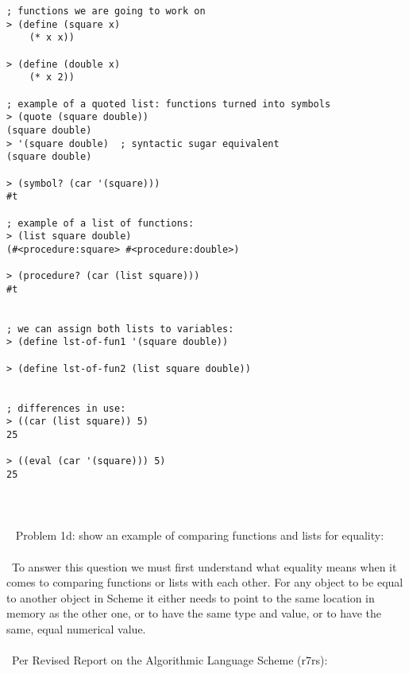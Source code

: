 \documentclass{article}
\begin{document}
\begin{verbatim} 
; functions we are going to work on
> (define (square x)
    (* x x))

> (define (double x)
    (* x 2))

; example of a quoted list: functions turned into symbols
> (quote (square double))
(square double)
> '(square double)	; syntactic sugar equivalent
(square double)

> (symbol? (car '(square)))
#t

; example of a list of functions:
> (list square double)
(#<procedure:square> #<procedure:double>)

> (procedure? (car (list square)))
#t


; we can assign both lists to variables: 
> (define lst-of-fun1 '(square double))

> (define lst-of-fun2 (list square double))


; differences in use:
> ((car (list square)) 5)
25

> ((eval (car '(square))) 5)
25
\end{verbatim}
\paragraph{}\
\paragraph{}\
\rmfamily
Problem 1d: show an example of comparing functions and lists for equality:
\paragraph{}\
To answer this question we must first understand what equality means when it comes to comparing functions or lists with each other. For any object to be equal to another object in Scheme it either needs to point to the same location in memory as the other one, or to have the same type and value, or to have the same, equal numerical value. 

\paragraph{}\
Per Revised Report on the Algorithmic Language Scheme (r7rs):
\end{document}
